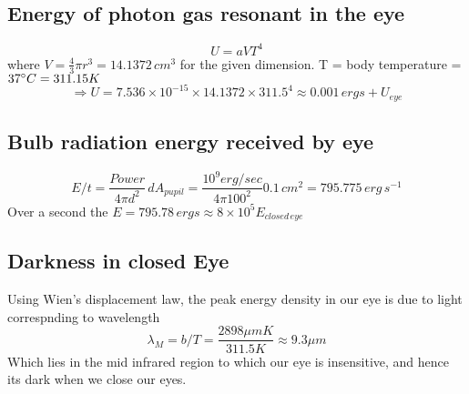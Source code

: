 \documentclass[11pt]{article}
\begin{document}
		\subsection{Energy of photon gas resonant in the eye}
		\[
			U = aVT^4
		\]
		where \(V = \frac{4}{3}\pi r^3 = 14.1372 \, cm^3\) for the given dimension.
		T = body temperature = \(37 \degree C =311.15 K\)
		\[
			\Rightarrow U = 7.536 \times 10^{-15} \times 14.1372 \times 311.5^4 \boxed{\approx 0.001 \, ergs +U_{eye}}
		\]
		\subsection{Bulb radiation energy received by eye}
		\[
			\boxed{E/t = \frac{Power}{4\pi d^2} \, dA_{pupil} = \frac{10^9 erg/sec}{4\pi 100^2} 0.1 \, cm^2 = 795.775 \, erg \, s^{-1} } 
		\]
		Over a second the \(E = 795.78 \, ergs \approx 8 \times 10^5 E_{closed \, eye}\)
		
		\subsection{Darkness in closed Eye}
		
		Using Wien's displacement law, the peak energy density in our eye is due to light correspnding to wavelength 
		\[
			\boxed{\lambda_M = b/T = \frac{2898 \mu m K}{311.5 K} \approx 9.3 \mu m}
		\]
		Which lies in the mid infrared region to which our eye is insensitive, and hence its dark when we close our eyes.
		
		
		
	
\end{document}

